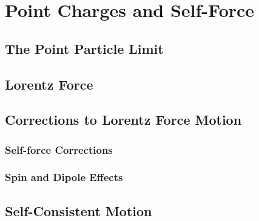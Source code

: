 \setcounter{chapter}{0}
\renewcommand{\thechapter}{10}
\chapter{Point Charges and Self-Force}\label{ch:10}
\setcounter{equation}{0}	        %

\section{The Point Particle Limit}

\section{Lorentz Force}

\section{Corrections to Lorentz Force Motion}

\subsection{Self-force Corrections}

\subsection{Spin and Dipole Effects}

\section{Self-Consistent Motion}



